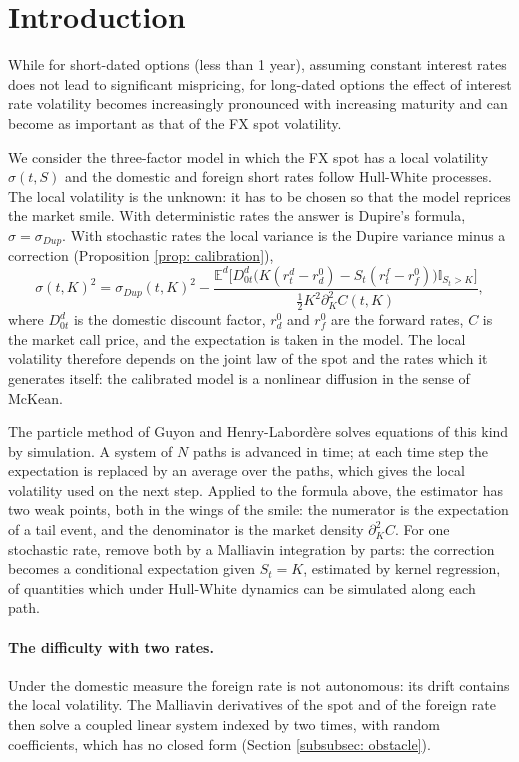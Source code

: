 \section{Introduction}\label{sec: introduction}
While for short-dated options (less than 1 year), assuming constant interest rates does not lead to
significant mispricing, for long-dated options the effect of interest rate volatility becomes increasingly
pronounced with increasing maturity and can become as important as that of the FX spot volatility.

We consider the three-factor model in which the FX spot has a local volatility $\sigma(t,S)$ and the domestic and foreign short rates follow Hull-White processes. The local volatility is the unknown: it has to be chosen so that the model reprices the market smile. With deterministic rates the answer is Dupire's formula, $\sigma=\sigma_{Dup}$. With stochastic rates the local variance is the Dupire variance minus a correction (Proposition \ref{prop: calibration}),
\[
\sigma(t,K)^2 = \sigma_{Dup}(t,K)^2 - \frac{ \mathbb{E}^d\big[ D_{0t}^d\big(K(r_t^d-r^0_d)-S_t(r_t^f-r^0_f)\big)\mathbb{I}_{S_t>K} \big]}{ \frac{1}{2}K^2\partial^2_KC(t,K) },
\]
where $D^d_{0t}$ is the domestic discount factor, $r^0_d$ and $r^0_f$ are the forward rates, $C$ is the market call price, and the expectation is taken in the model. The local volatility therefore depends on the joint law of the spot and the rates which it generates itself: the calibrated model is a nonlinear diffusion in the sense of McKean.

The particle method of Guyon and Henry-Labord\`ere \cite{guyonLabordere} solves equations of this kind by simulation. A system of $N$ paths is advanced in time; at each time step the expectation is replaced by an average over the paths, which gives the local volatility used on the next step. Applied to the formula above, the estimator has two weak points, both in the wings of the smile: the numerator is the expectation of a tail event, and the denominator is the market density $\partial^2_KC$. For one stochastic rate, \cite{guyonLabordere} remove both by a Malliavin integration by parts: the correction becomes a conditional expectation given $S_t=K$, estimated by kernel regression, of quantities which under Hull-White dynamics can be simulated along each path.

\paragraph{The difficulty with two rates.} Under the domestic measure the foreign rate is not autonomous: its drift contains the local volatility. The Malliavin derivatives of the spot and of the foreign rate then solve a coupled linear system indexed by two times, with random coefficients, which has no closed form (Section \ref{subsubsec: obstacle}).

